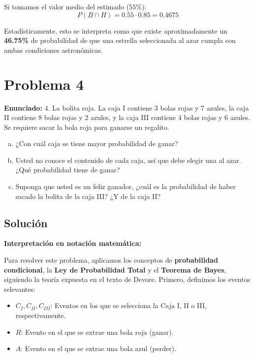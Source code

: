 \documentclass[a4paper]{article}
\begin{document}
\begin{enumerate}[a.]
    Si tomamos el valor medio del estimado ($55\%$):
    $$ P(B \cap H) = 0.55 \cdot 0.85 = 0.4675 $$
    
    Estadísticamente, esto se interpreta como que existe aproximadamente un \textbf{46.75\%} de probabilidad de que una estrella seleccionada al azar cumpla con ambas condiciones astronómicas.
\end{enumerate}

\section{Problema 4}
\textbf{Enunciado:}
4. La bolita roja. La caja I contiene 3 bolas rojas y 7 azules, la caja II contiene 8 bolas rojas y 2 azules, y la caja III contiene 4 bolas rojas y 6 azules. Se requiere sacar la bola roja para ganarse un regalito.
\begin{enumerate}[a.]
    \item ¿Con cuál caja se tiene mayor probabilidad de ganar?
    \item Usted no conoce el contenido de cada caja, así que debe elegir una al azar. ¿Qué probabilidad tiene de ganar?
    \item Suponga que usted es un feliz ganador, ¿cuál es la probabilidad de haber sacado la bolita de la caja III? ¿Y de la caja II?
\end{enumerate}

\subsection*{Solución}

\textbf{Interpretación en notación matemática:}

Para resolver este problema, aplicamos los conceptos de \textbf{probabilidad condicional}, la \textbf{Ley de Probabilidad Total} y el \textbf{Teorema de Bayes}, siguiendo la teoría expuesta en el texto de Devore. Primero, definimos los eventos relevantes:
\begin{itemize}
    \item $C_I, C_{II}, C_{III}$: Eventos en los que se selecciona la Caja I, II o III, respectivamente.
    \item $R$: Evento en el que se extrae una bola roja (ganar).
    \item $A$: Evento en el que se extrae una bola azul (perder).
\end{itemize}
\end{document}
